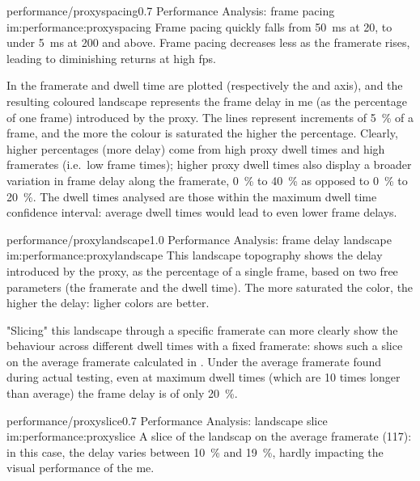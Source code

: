 \begin{image}
	{performance/proxyspacing}{0.7}
	{Performance Analysis: frame pacing}
	{im:performance:proxyspacing}
	{}
	{Frame pacing quickly falls from \SI{50}{\milli\second} at \SI{20}{\fps}, to under \SI{5}{\milli\second} at \SI{200}{\fps} and above. Frame pacing decreases less as the \gls{framerate} rises, leading to diminishing returns at high \gls{fps}.}
\end{image}

In  the \gls{framerate} and dwell time are plotted (respectively the  and  axis), and the resulting coloured landscape represents the frame delay in \gls{me} (as the percentage of one frame) introduced by the \gls{proxy}. The lines represent increments of \SI{5}{\percent} of a frame, and the more the colour is saturated the higher the percentage. Clearly, higher percentages (more delay) come from high \gls{proxy} dwell times and high \glspl{framerate} (i.e.\ low frame times); higher \gls{proxy} dwell times also display a broader variation in frame delay along the \gls{framerate}, \SI{0}{\percent} to \SI{40}{\percent} as opposed to \SI{0}{\percent} to \SI{20}{\percent}. The dwell times analysed are those within the maximum dwell time confidence interval: average dwell times would lead to even lower frame delays.

\begin{image}
	{performance/proxylandscape}{1.0}
	{Performance Analysis: frame delay landscape}
	{im:performance:proxylandscape}
	{}
	{This landscape topography shows the delay introduced by the \gls{proxy}, as the percentage of a single frame, based on two free parameters (the \gls{framerate} and the dwell time). The more saturated the color, the higher the delay: ligher colors are better.}
\end{image}

"Slicing" this landscape through a specific \gls{framerate} can more clearly show the behaviour across different dwell times with a fixed \gls{framerate}:  shows such a slice on the average \gls{framerate} calculated in . Under the average \gls{framerate} found during actual testing, even at maximum dwell times (which are \num{10} times longer than average) the frame delay is of only \SI{20}{\percent}.

\begin{image}
	{performance/proxyslice}{0.7}
	{Performance Analysis: landscape slice}
	{im:performance:proxyslice}
	{}
	{A slice of the landscap on the average \gls{framerate} (\SI{117}{\fps}): in this case, the delay varies between \SI{10}{\percent} and \SI{19}{\percent}, hardly impacting the visual performance of the \gls{me}.}
\end{image}

